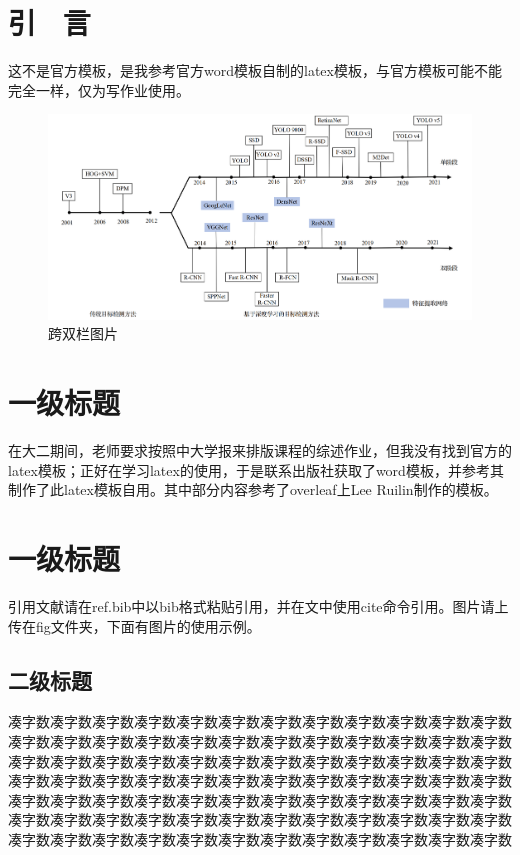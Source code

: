 \documentclass{article}
\begin{document}
\begin{multicols}{2}

\section{ 引 \ 言}
\songti  %
这不是官方模板，是我参考官方word模板自制的latex模板，与官方模板可能不能完全一样，仅为写作业使用。

\begin{figure}[t]
    \centering
    \includegraphics[width=\textwidth]{fig/发展历程.png}
    \caption{跨双栏图片\cite{计算机工程与应用04_fig}}
    \label{fig:发展历程}
\end{figure}

\section{一级标题}
在大二期间，老师要求按照中大学报来排版课程的综述作业，但我没有找到官方的latex模板；正好在学习latex的使用，于是联系出版社获取了word模板，并参考其制作了此latex模板自用。其中部分内容参考了overleaf上Lee Ruilin制作的模板。

\section{一级标题}
引用文献请在ref.bib中以bib格式粘贴引用，并在文中使用cite命令引用。图片请上传在fig文件夹，下面有图片的使用示例。

\subsection{二级标题}
凑字数凑字数凑字数凑字数凑字数凑字数凑字数凑字数凑字数凑字数凑字数凑字数凑字数凑字数凑字数凑字数凑字数凑字数凑字数凑字数凑字数凑字数凑字数凑字数凑字数凑字数凑字数凑字数凑字数凑字数凑字数凑字数凑字数凑字数凑字数凑字数凑字数凑字数凑字数凑字数凑字数凑字数凑字数凑字数凑字数凑字数凑字数凑字数凑字数凑字数凑字数凑字数凑字数凑字数凑字数凑字数凑字数凑字数凑字数凑字数凑字数凑字数凑字数凑字数凑字数凑字数凑字数凑字数凑字数凑字数凑字数凑字数凑字数凑字数凑字数凑字数凑字数凑字数凑字数凑字数凑字数凑字数凑字数凑字数


\end{multicols}
\end{document}
